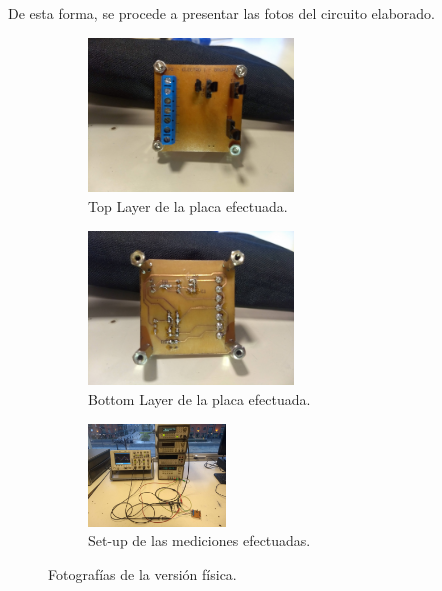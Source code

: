 De esta forma, se procede a presentar las fotos del circuito elaborado.
\begin{figure}[H]
\centering
\begin{subfigure}{.49\textwidth}
\centering
	\includegraphics[width=0.6\textwidth, trim={40cm 20cm 30cm 15cm}, clip]{Imagenes/Placa-Up.jpg}
	\caption{Top Layer de la placa efectuada.}
	\label{fig:pup}
\end{subfigure}
\begin{subfigure}{.49\textwidth}
\centering
	\includegraphics[width=0.6\textwidth, trim={25cm 10cm 30cm 10cm}, clip]{Imagenes/Placa-Down.jpg}
	\caption{Bottom Layer de la placa efectuada.}
	\label{fig:pd}
\end{subfigure}
\begin{subfigure}{.8\textwidth}
\centering
	\includegraphics[width=0.4\textwidth, trim={20cm 0 20cm 0}, clip]{Imagenes/Medicion.jpg}
	\caption{Set-up de las mediciones efectuadas.}
	\label{fig:setup}
\end{subfigure}
\caption{Fotografías de la versión física.}
\label{fig:fotos}
\end{figure}

